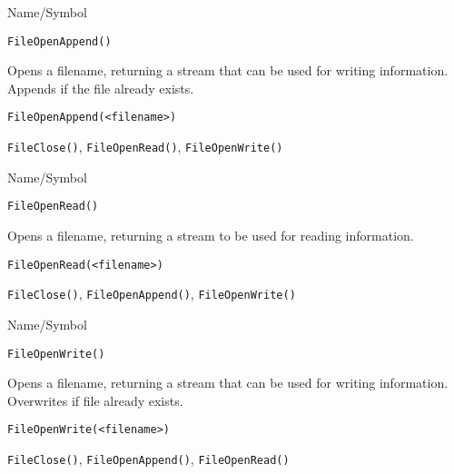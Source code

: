\rl




\begin{desc}{Name/Symbol}
\item[Name/Symbol]	\verb+FileOpenAppend()+

\item[Description] Opens a filename, returning a stream that can be
  used for writing information.  Appends if the file already exists.

\item[Usage]
\begin{verbatim}
FileOpenAppend(<filename>)
\end{verbatim}

\item[Example]	

\item[See Also]	\verb+FileClose()+, \verb+FileOpenRead()+, \verb+FileOpenWrite()+
\end{desc}

\rl



\begin{desc}{Name/Symbol}
\item[Name/Symbol]	\verb+FileOpenRead()+

\item[Description]  	Opens a filename, returning  a stream to be used 
		for reading information.

\item[Usage]
\begin{verbatim}
FileOpenRead(<filename>)
\end{verbatim}

\item[Example]	

\item[See Also]	\verb+FileClose()+, \verb+FileOpenAppend()+, \verb+FileOpenWrite()+
\end{desc}

\rl


\begin{desc}{Name/Symbol}
\item[Name/Symbol]	\verb+FileOpenWrite()+

\item[Description] Opens a filename, returning a stream that can be
  used for writing information.  Overwrites if file already exists.

\item[Usage]
\begin{verbatim}
FileOpenWrite(<filename>)
\end{verbatim}

\item[Example]	

\item[See Also]	\verb+FileClose()+, \verb+FileOpenAppend()+, \verb+FileOpenRead()+
\end{desc}

